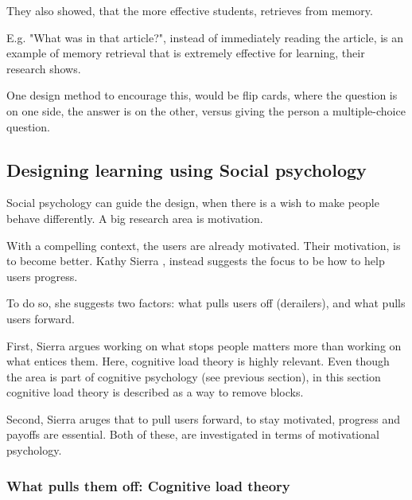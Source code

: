   They also showed, that the more effective students, retrieves from memory.

  E.g. "What was in that article?", instead of immediately reading the article, is an example of memory retrieval that is extremely effective for learning, their research shows.

  One design method to encourage this, would be flip cards, where the question is on one side, the answer is on the other, versus giving the person a multiple-choice question.



%

\subsection{Designing learning using Social psychology}

Social psychology can guide the design, when there is a wish to make people behave differently. A big research area is motivation.

With a compelling context, the users are already motivated. Their motivation, is to become better. Kathy Sierra \cite{kathy}, instead suggests the focus to be how to help users progress.

To do so, she suggests two factors: what pulls users off (derailers), and what pulls users forward.

First, Sierra argues working on what stops people matters more than working on what entices them. Here, cognitive load theory is highly relevant. Even though the area is part of cognitive psychology (see previous section), in this section cognitive load theory is described as a way to remove blocks.

Second, Sierra aruges that to pull users forward, to stay motivated, progress and payoffs are essential. Both of these, are investigated in terms of motivational psychology.

\subsubsection{What pulls them off: Cognitive load theory}

